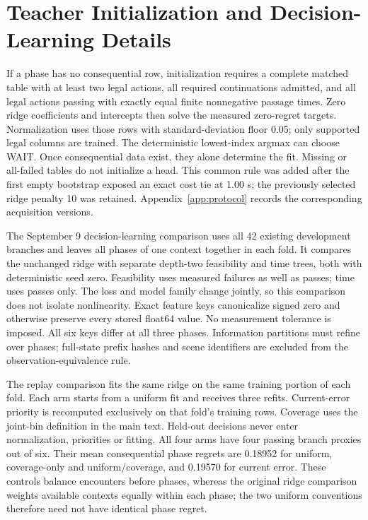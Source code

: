 \section{Teacher Initialization and Decision-Learning Details}
\label{app:initialization}
If a phase has no consequential row, initialization requires a complete matched
table with at least two legal actions, all required continuations admitted, and
all legal actions passing with exactly equal finite nonnegative passage times.
Zero ridge coefficients and intercepts then solve the measured zero-regret
targets. Normalization uses those rows with standard-deviation floor 0.05; only
supported legal columns are trained. The deterministic lowest-index argmax can
choose WAIT. Once consequential data exist, they alone determine the fit.
Missing or all-failed tables do not initialize a head. This common rule was added
after the first empty bootstrap exposed an exact cost tie at 1.00 s; the
previously selected ridge penalty 10 was retained. Appendix~\ref{app:protocol}
records the corresponding acquisition versions.

The September 9 decision-learning comparison uses all 42 existing development
branches and leaves all phases of one context together in each fold. It compares
the unchanged ridge with separate depth-two feasibility and time trees, both
with deterministic seed zero. Feasibility uses measured failures as well as
passes; time uses passes only. The loss and model family change jointly, so this
comparison does not isolate nonlinearity. Exact feature keys canonicalize signed
zero and otherwise preserve every stored float64 value. No measurement tolerance
is imposed. All six keys differ at all three phases. Information partitions must
refine over phases; full-state prefix hashes and scene identifiers are excluded
from the observation-equivalence rule.

The replay comparison fits the same ridge on the same training portion of each
fold. Each arm starts from a uniform fit and receives three refits. Current-error
priority is recomputed exclusively on that fold's training rows. Coverage uses
the joint-bin definition in the main text. Held-out decisions never enter
normalization, priorities or fitting. All four arms have four passing branch
proxies out of six. Their mean consequential phase regrets are 0.18952 for
uniform, coverage-only and uniform/coverage, and 0.19570 for current error.
These controls balance encounters before phases, whereas the original ridge
comparison weights available contexts equally within each phase; the two
uniform conventions therefore need not have identical phase regret.

